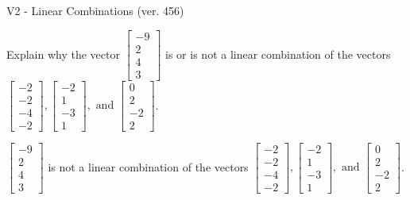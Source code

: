 \begin{exercise}
  \begin{exerciseTitle}V2 - Linear Combinations (ver. 456)\end{exerciseTitle}
  \begin{exerciseStatement}
    Explain why the vector \(\left[\begin{array}{c}
-9 \\
2 \\
4 \\
3
\end{array}\right]\)  is or is not a linear 
	combination of the vectors \(\left[\begin{array}{c}
-2 \\
-2 \\
-4 \\
-2
\end{array}\right] , \left[\begin{array}{c}
-2 \\
1 \\
-3 \\
1
\end{array}\right] , \text{ and } \left[\begin{array}{c}
0 \\
2 \\
-2 \\
2
\end{array}\right]\).
	


  \end{exerciseStatement}
  \begin{exerciseAnswer}
   \(\left[\begin{array}{c}
-9 \\
2 \\
4 \\
3
\end{array}\right]\) 
  	 is not  
	a linear combination of the vectors \(\left[\begin{array}{c}
-2 \\
-2 \\
-4 \\
-2
\end{array}\right] , \left[\begin{array}{c}
-2 \\
1 \\
-3 \\
1
\end{array}\right] , \text{ and } \left[\begin{array}{c}
0 \\
2 \\
-2 \\
2
\end{array}\right]\).

	
  


  \end{exerciseAnswer}
\end{exercise}